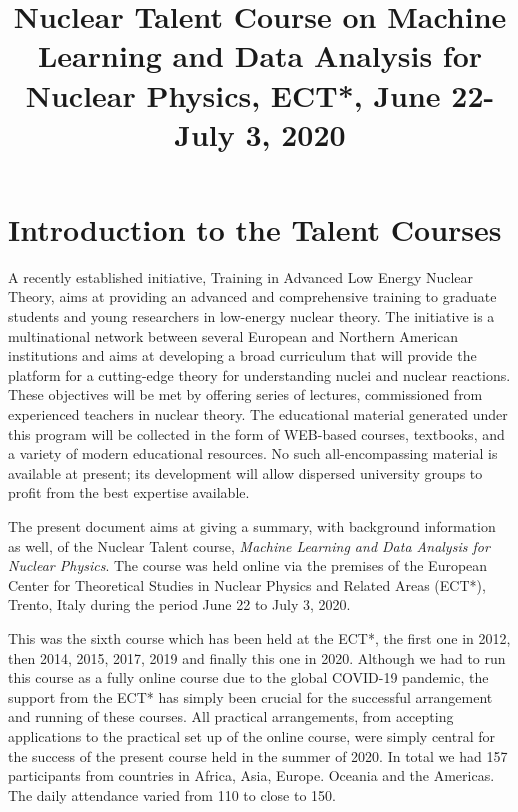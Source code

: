 \documentclass[prc,amsart,english]{revtex4}
\begin{document}
\title{Nuclear Talent Course on Machine Learning and Data Analysis for Nuclear Physics, ECT*, June 22-July 3, 2020}
\maketitle

\section{Introduction to the Talent Courses}

A recently established initiative, Training in Advanced Low Energy
Nuclear Theory, aims at providing an advanced and comprehensive
training to graduate students and young researchers in low-energy
nuclear theory. The initiative is a multinational network between
several European and Northern American institutions and aims at
developing a broad curriculum that will provide the platform for a
cutting-edge theory for understanding nuclei and nuclear
reactions. These objectives will be met by offering series of
lectures, commissioned from experienced teachers in nuclear
theory. The educational material generated under this program will be
collected in the form of WEB-based courses, textbooks, and a variety
of modern educational resources. No such all-encompassing material is
available at present; its development will allow dispersed university
groups to profit from the best expertise available.



The present document aims at giving a summary, 
with background information as well, of  the Nuclear Talent course, {\em Machine Learning and Data Analysis for Nuclear Physics}.
The course was held online via the  premises of the European Center for Theoretical Studies
in Nuclear Physics and Related Areas (ECT*), Trento, Italy during the period June 22 to July 3, 2020. 

This was the sixth course which has been held at the ECT*, the first one in 2012, then 2014, 2015, 2017, 2019 and finally this one in 2020. Although we had to run this course as a fully online course due to the global COVID-19 pandemic, the support from the ECT* has simply been crucial for the successful arrangement and running of these courses.
All practical arrangements, from accepting applications to the practical set up of the online course, were simply central for the success of the present  course held in the summer of 2020.
In total we had 157 participants from countries in Africa, Asia, Europe. Oceania and the Americas. The daily attendance varied from 110 to close to 150.
\end{document}
